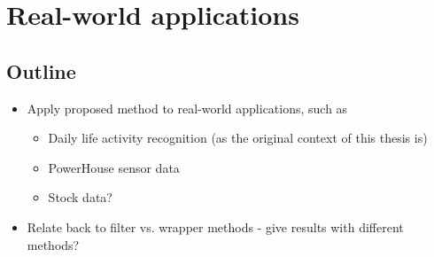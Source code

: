 
\chapter{Real-world applications}

\label{Chapter6} %


\section{Outline}
\begin{itemize}
  \item Apply proposed method to real-world applications, such as
    \begin{itemize}
      \item Daily life activity recognition (as the original context of this thesis is)
      \item PowerHouse sensor data
      \item Stock data?
    \end{itemize}
  \item Relate back to filter vs. wrapper methods - give results with different methods?
\end{itemize}